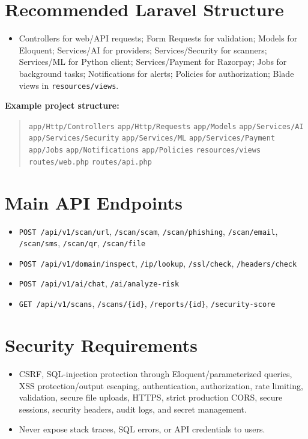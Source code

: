 \documentclass[11pt,a4paper]{article}
\begin{document}
\section{Recommended Laravel Structure}
\begin{itemize}[noitemsep]
    \item Controllers for web/API requests; Form Requests for validation; Models for Eloquent; Services/AI for providers; Services/Security for scanners; Services/ML for Python client; Services/Payment for Razorpay; Jobs for background tasks; Notifications for alerts; Policies for authorization; Blade views in \texttt{resources/views}.
\end{itemize}
\textbf{Example project structure:}
\begin{quote}
\texttt{app/Http/Controllers} \textbar{} \texttt{app/Http/Requests} \textbar{} \texttt{app/Models} \textbar{} \texttt{app/Services/AI} \textbar{} \texttt{app/Services/Security} \textbar{} \texttt{app/Services/ML} \textbar{} \texttt{app/Services/Payment} \textbar{} \texttt{app/Jobs} \textbar{} \texttt{app/Notifications} \textbar{} \texttt{app/Policies} \textbar{} \texttt{resources/views} \textbar{} \texttt{routes/web.php} \textbar{} \texttt{routes/api.php}
\end{quote}

\section{Main API Endpoints}
\begin{itemize}[noitemsep]
    \item \texttt{POST /api/v1/scan/url}, \texttt{/scan/scam}, \texttt{/scan/phishing}, \texttt{/scan/email}, \texttt{/scan/sms}, \texttt{/scan/qr}, \texttt{/scan/file}
    \item \texttt{POST /api/v1/domain/inspect}, \texttt{/ip/lookup}, \texttt{/ssl/check}, \texttt{/headers/check}
    \item \texttt{POST /api/v1/ai/chat}, \texttt{/ai/analyze-risk}
    \item \texttt{GET /api/v1/scans}, \texttt{/scans/\{id\}}, \texttt{/reports/\{id\}}, \texttt{/security-score}
\end{itemize}

\section{Security Requirements}
\begin{itemize}[noitemsep]
    \item CSRF, SQL-injection protection through Eloquent/parameterized queries, XSS protection/output escaping, authentication, authorization, rate limiting, validation, secure file uploads, HTTPS, strict production CORS, secure sessions, security headers, audit logs, and secret management.
    \item Never expose stack traces, SQL errors, or API credentials to users.
\end{itemize}
\end{document}
